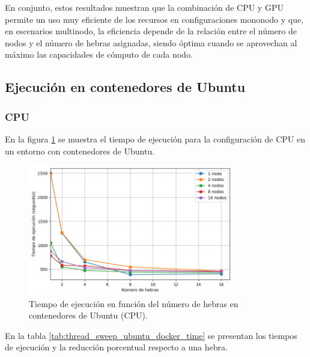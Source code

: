 En conjunto, estos resultados muestran que la combinación de CPU y GPU permite un uso muy eficiente de los recursos en configuraciones mononodo y que, en escenarios multinodo, la eficiencia depende de la relación entre el número de nodos y el número de hebras asignadas, siendo óptima cuando se aprovechan al máximo las capacidades de cómputo de cada nodo.


\subsection{Ejecución en contenedores de Ubuntu}
\subsubsection{CPU}

En la figura \ref{fig:thread_sweep_ubuntu_docker_time} se muestra el tiempo de ejecución para la configuración de CPU en un entorno con contenedores de Ubuntu.

\begin{figure}[H]
    \centering
    \includegraphics[width=0.8\textwidth]{imagenes/cap5/thread_sweep_ubuntu_docker_time.png}
    \caption{Tiempo de ejecución en función del número de hebras en contenedores de Ubuntu (CPU).}
    \label{fig:thread_sweep_ubuntu_docker_time}
\end{figure}

En la tabla \ref{tab:thread_sweep_ubuntu_docker_time} se presentan los tiempos de ejecución y la reducción porcentual respecto a una hebra.

